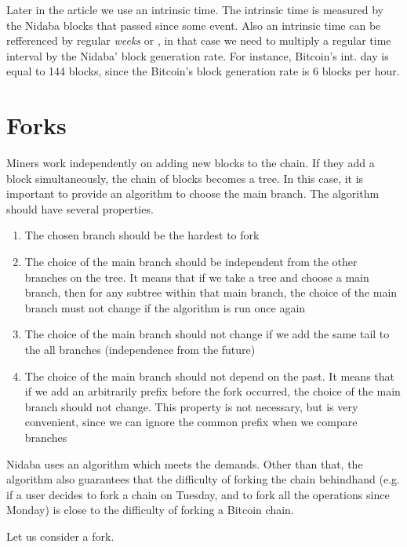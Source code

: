 \documentclass[12pt]{article}
\begin{document}
Later in the article we use an intrinsic time. The intrinsic time is measured by the Nidaba blocks that passed since some event. Also an intrinsic time can be refferenced by regular \textit{weeks} or , in that case we need to multiply a regular time interval by the Nidaba' block generation rate. For instance, Bitcoin's int. day is equal to 144 blocks, since the Bitcoin's block generation rate is 6 blocks per hour.

\section{Forks}

Miners work independently on adding new blocks to the chain. If they add a block simultaneously, the chain of blocks becomes a tree. In this case, it is important to provide an algorithm to choose the main branch. The algorithm should have several properties.

\begin{enumerate}
  \item The chosen branch should be the hardest to fork
  \item The choice of the main branch should be independent from the other branches on the tree. It means that if we take a tree and choose a main branch, then for any subtree within that main branch, the choice of the main branch must not change if the algorithm is run once again
  \item The choice of the main branch should not change if we add the same tail to the all branches (independence from the future)
  \item The choice of the main branch should not depend on the past. It means that if we add an arbitrarily prefix before the fork occurred, the choice of the main branch should not change. This property is not necessary, but is very convenient, since we can ignore the common prefix when we compare branches
\end{enumerate}

Nidaba uses an algorithm which meets the demands. Other than that, the algorithm also guarantees that the difficulty of forking the chain behindhand (e.g. if a user decides to fork a chain on Tuesday, and to fork all the operations since Monday) is close to the difficulty of forking a Bitcoin chain.

Let us consider a fork.

\begin{figure}[H]
\centering
{}
\end{figure}
\end{document}
